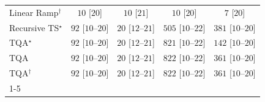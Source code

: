 \begin{tabular}{l|cccc|}
Linear Ramp$^\dagger$ & {\cellcolor[HTML]{F7FCF5}} \color[HTML]{000000} $10$ [$20$] & {\cellcolor[HTML]{F7FCF5}} \color[HTML]{000000} $10$ [$21$] & {\cellcolor[HTML]{F7FCF5}} \color[HTML]{000000} $10$ [$20$] & {\cellcolor[HTML]{F7FCF5}} \color[HTML]{000000} $7$ [$20$] \\
Recursive TS$^\star$ & {\cellcolor[HTML]{E8F6E4}} \color[HTML]{000000} $92$ [$10$--$20$] & {\cellcolor[HTML]{F5FBF2}} \color[HTML]{000000} $20$ [$12$--$21$] & {\cellcolor[HTML]{48AE60}} \color[HTML]{F1F1F1} $505$ [$10$--$22$] & {\cellcolor[HTML]{84CC83}} \color[HTML]{000000} $381$ [$10$--$20$] \\
TQA$^\star$ & {\cellcolor[HTML]{E8F6E4}} \color[HTML]{000000} $92$ [$10$--$20$] & {\cellcolor[HTML]{F5FBF2}} \color[HTML]{000000} $20$ [$12$--$21$] & {\cellcolor[HTML]{00471C}} \color[HTML]{F1F1F1} $821$ [$10$--$22$] & {\cellcolor[HTML]{DBF1D6}} \color[HTML]{000000} $142$ [$10$--$20$] \\
TQA & {\cellcolor[HTML]{E8F6E4}} \color[HTML]{000000} $92$ [$10$--$20$] & {\cellcolor[HTML]{F5FBF2}} \color[HTML]{000000} $20$ [$12$--$21$] & {\cellcolor[HTML]{00451C}} \color[HTML]{F1F1F1} $822$ [$10$--$22$] & {\cellcolor[HTML]{8DD08A}} \color[HTML]{000000} $361$ [$10$--$20$] \\
TQA$^\dagger$ & {\cellcolor[HTML]{E8F6E4}} \color[HTML]{000000} $92$ [$10$--$20$] & {\cellcolor[HTML]{F5FBF2}} \color[HTML]{000000} $20$ [$12$--$21$] & {\cellcolor[HTML]{00451C}} \color[HTML]{F1F1F1} $822$ [$10$--$22$] & {\cellcolor[HTML]{8DD08A}} \color[HTML]{000000} $361$ [$10$--$20$] \\
\cline{1-5}
\bottomrule
\end{tabular}
